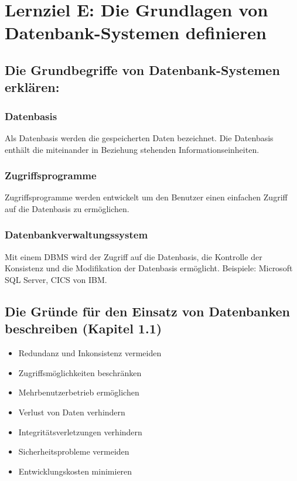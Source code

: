 \section{Lernziel E: Die Grundlagen von Datenbank-Systemen definieren}

\subsection{Die Grundbegriffe von Datenbank-Systemen erklären:}

\subsubsection{Datenbasis}

Als Datenbasis werden die gespeicherten Daten bezeichnet. Die Datenbasis enthält die miteinander in Beziehung stehenden Informationseinheiten.

\subsubsection{Zugriffsprogramme} 

Zugriffsprogramme werden entwickelt um den Benutzer einen einfachen Zugriff auf die Datenbasis zu ermöglichen.

\subsubsection{Datenbankverwaltungssystem}

Mit einem \ac{DBMS} wird der Zugriff auf die Datenbasis, die Kontrolle der Konsistenz und die Modifikation der Datenbasis ermöglicht. Beispiele: Microsoft SQL Server, CICS von IBM.

\subsection{Die Gründe für den Einsatz von Datenbanken beschreiben (Kapitel 1.1)}

\begin{itemize}
	\item Redundanz und Inkonsistenz vermeiden
	\item Zugriffsmöglichkeiten beschränken
	\item Mehrbenutzerbetrieb ermöglichen
	\item Verlust von Daten verhindern
	\item Integritätsverletzungen verhindern
	\item Sicherheitsprobleme vermeiden
	\item Entwicklungskosten minimieren
\end{itemize}

